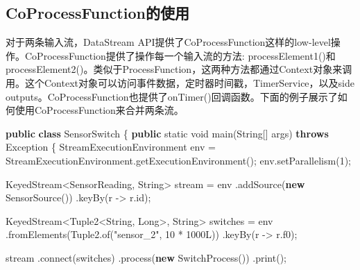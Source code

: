 \documentclass[cn,11pt,chinese]{elegantbook}
\newenvironment{Shaded}{}{}
\newcommand{\BuiltInTok}[1]{#1}
\newcommand{\DataTypeTok}[1]{\textcolor[rgb]{0.56,0.13,0.00}{#1}}
\newcommand{\DecValTok}[1]{\textcolor[rgb]{0.25,0.63,0.44}{#1}}
\newcommand{\FunctionTok}[1]{\textcolor[rgb]{0.02,0.16,0.49}{#1}}
\newcommand{\KeywordTok}[1]{\textcolor[rgb]{0.00,0.44,0.13}{\textbf{#1}}}
\newcommand{\NormalTok}[1]{#1}
\newcommand{\StringTok}[1]{\textcolor[rgb]{0.25,0.44,0.63}{#1}}
\begin{document}
\hypertarget{coprocessfunctionux7684ux4f7fux7528}{%
\subsection{CoProcessFunction的使用}\label{coprocessfunctionux7684ux4f7fux7528}}

对于两条输入流，DataStream
API提供了CoProcessFunction这样的low-level操作。CoProcessFunction提供了操作每一个输入流的方法:
processElement1()和processElement2()。类似于ProcessFunction，这两种方法都通过Context对象来调用。这个Context对象可以访问事件数据，定时器时间戳，TimerService，以及side
outputs。CoProcessFunction也提供了onTimer()回调函数。下面的例子展示了如何使用CoProcessFunction来合并两条流。

\begin{Shaded}
\begin{Highlighting}[]
\KeywordTok{public} \KeywordTok{class}\NormalTok{ SensorSwitch \{}
    \KeywordTok{public} \DataTypeTok{static} \DataTypeTok{void} \FunctionTok{main}\NormalTok{(}\BuiltInTok{String}\NormalTok{[] args) }\KeywordTok{throws} \BuiltInTok{Exception}\NormalTok{ \{}
\NormalTok{        StreamExecutionEnvironment env = StreamExecutionEnvironment.}\FunctionTok{getExecutionEnvironment}\NormalTok{();}
\NormalTok{        env.}\FunctionTok{setParallelism}\NormalTok{(}\DecValTok{1}\NormalTok{);}

\NormalTok{        KeyedStream\textless{}SensorReading, }\BuiltInTok{String}\NormalTok{\textgreater{} stream = env}
\NormalTok{                .}\FunctionTok{addSource}\NormalTok{(}\KeywordTok{new} \FunctionTok{SensorSource}\NormalTok{())}
\NormalTok{                .}\FunctionTok{keyBy}\NormalTok{(r {-}\textgreater{} r.}\FunctionTok{id}\NormalTok{);}

\NormalTok{        KeyedStream\textless{}Tuple2\textless{}}\BuiltInTok{String}\NormalTok{, }\BuiltInTok{Long}\NormalTok{\textgreater{}, }\BuiltInTok{String}\NormalTok{\textgreater{} switches = env}
\NormalTok{                .}\FunctionTok{fromElements}\NormalTok{(Tuple2.}\FunctionTok{of}\NormalTok{(}\StringTok{"sensor\_2"}\NormalTok{, }\DecValTok{10}\NormalTok{ * }\DecValTok{1000L}\NormalTok{))}
\NormalTok{                .}\FunctionTok{keyBy}\NormalTok{(r {-}\textgreater{} r.}\FunctionTok{f0}\NormalTok{);}

\NormalTok{        stream}
\NormalTok{                .}\FunctionTok{connect}\NormalTok{(switches)}
\NormalTok{                .}\FunctionTok{process}\NormalTok{(}\KeywordTok{new} \FunctionTok{SwitchProcess}\NormalTok{())}
\NormalTok{                .}\FunctionTok{print}\NormalTok{();}


\end{Highlighting}
\end{Shaded}
\end{document}
